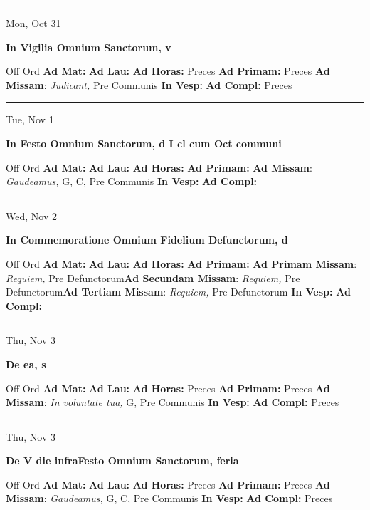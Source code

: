 \documentclass[letterpaper, 10pt]{article}
\begin{document}
\hrule
\begin{center}
Mon, Oct 31
\end{center}\textbf{ \large In Vigilia Omnium Sanctorum, \textnormal{\normalsize v}}
\begin{justify}
Off Ord
\textbf{Ad Mat: }
\textbf{Ad Lau: }
\textbf{Ad Horas: }Preces
\textbf{Ad Primam: }Preces
\textbf{Ad Missam}: \textit{Judicant,} Pre Communis
\textbf{In Vesp: }
\textbf{Ad Compl: }Preces\end{justify}



\hrule
\begin{center}
Tue, Nov 1
\end{center}\textbf{ \large In Festo Omnium Sanctorum, \textnormal{\normalsize d I cl cum Oct communi}}
\begin{justify}
Off Ord
\textbf{Ad Mat: }
\textbf{Ad Lau: }
\textbf{Ad Horas: }
\textbf{Ad Primam: }
\textbf{Ad Missam}: \textit{Gaudeamus,} G, C, Pre Communis
\textbf{In Vesp: }
\textbf{Ad Compl: }\end{justify}



\hrule
\begin{center}
Wed, Nov 2
\end{center}\textbf{ \large In Commemoratione Omnium Fidelium Defunctorum, \textnormal{\normalsize d}}
\begin{justify}
Off Ord
\textbf{Ad Mat: }
\textbf{Ad Lau: }
\textbf{Ad Horas: }
\textbf{Ad Primam: }
\textbf{Ad Primam Missam}: \textit{Requiem,} Pre Defunctorum\textbf{Ad Secundam Missam}: \textit{Requiem,} Pre Defunctorum\textbf{Ad Tertiam Missam}: \textit{Requiem,} Pre Defunctorum
\textbf{In Vesp: }
\textbf{Ad Compl: }\end{justify}



\hrule
\begin{center}
Thu, Nov 3
\end{center}\textbf{ \large De ea, \textnormal{\normalsize s}}
\begin{justify}
Off Ord
\textbf{Ad Mat: }
\textbf{Ad Lau: }
\textbf{Ad Horas: }Preces
\textbf{Ad Primam: }Preces
\textbf{Ad Missam}: \textit{In voluntate tua,} G, Pre Communis
\textbf{In Vesp: }
\textbf{Ad Compl: }Preces\end{justify}



\hrule
\begin{center}
Thu, Nov 3
\end{center}\textbf{ \large De V die infraFesto Omnium Sanctorum, \textnormal{\normalsize feria}}
\begin{justify}
Off Ord
\textbf{Ad Mat: }
\textbf{Ad Lau: }
\textbf{Ad Horas: }Preces
\textbf{Ad Primam: }Preces
\textbf{Ad Missam}: \textit{Gaudeamus,} G, C, Pre Communis
\textbf{In Vesp: }
\textbf{Ad Compl: }Preces\end{justify}
\end{document}
